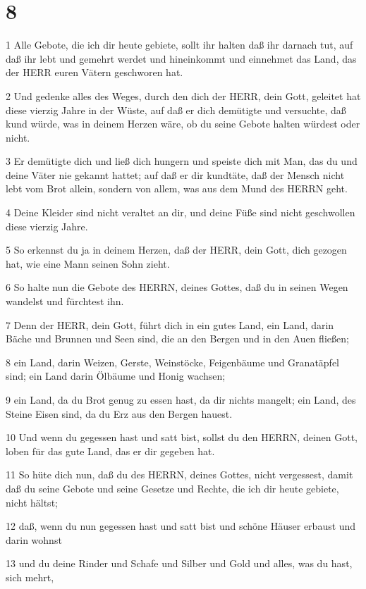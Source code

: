 \chapter{8}

\par 1 Alle Gebote, die ich dir heute gebiete, sollt ihr halten daß ihr darnach tut, auf daß ihr lebt und gemehrt werdet und hineinkommt und einnehmet das Land, das der HERR euren Vätern geschworen hat.
\par 2 Und gedenke alles des Weges, durch den dich der HERR, dein Gott, geleitet hat diese vierzig Jahre in der Wüste, auf daß er dich demütigte und versuchte, daß kund würde, was in deinem Herzen wäre, ob du seine Gebote halten würdest oder nicht.
\par 3 Er demütigte dich und ließ dich hungern und speiste dich mit Man, das du und deine Väter nie gekannt hattet; auf daß er dir kundtäte, daß der Mensch nicht lebt vom Brot allein, sondern von allem, was aus dem Mund des HERRN geht.
\par 4 Deine Kleider sind nicht veraltet an dir, und deine Füße sind nicht geschwollen diese vierzig Jahre.
\par 5 So erkennst du ja in deinem Herzen, daß der HERR, dein Gott, dich gezogen hat, wie eine Mann seinen Sohn zieht.
\par 6 So halte nun die Gebote des HERRN, deines Gottes, daß du in seinen Wegen wandelst und fürchtest ihn.
\par 7 Denn der HERR, dein Gott, führt dich in ein gutes Land, ein Land, darin Bäche und Brunnen und Seen sind, die an den Bergen und in den Auen fließen;
\par 8 ein Land, darin Weizen, Gerste, Weinstöcke, Feigenbäume und Granatäpfel sind; ein Land darin Ölbäume und Honig wachsen;
\par 9 ein Land, da du Brot genug zu essen hast, da dir nichts mangelt; ein Land, des Steine Eisen sind, da du Erz aus den Bergen hauest.
\par 10 Und wenn du gegessen hast und satt bist, sollst du den HERRN, deinen Gott, loben für das gute Land, das er dir gegeben hat.
\par 11 So hüte dich nun, daß du des HERRN, deines Gottes, nicht vergessest, damit daß du seine Gebote und seine Gesetze und Rechte, die ich dir heute gebiete, nicht hältst;
\par 12 daß, wenn du nun gegessen hast und satt bist und schöne Häuser erbaust und darin wohnst
\par 13 und du deine Rinder und Schafe und Silber und Gold und alles, was du hast, sich mehrt,

